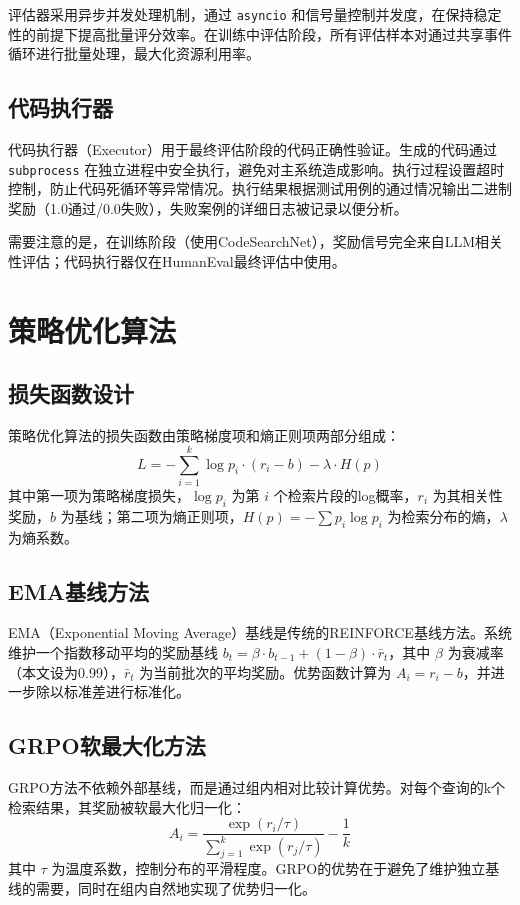 \documentclass[
    fontset = win, %
  ]{njuthesis}
\begin{document}
评估器采用异步并发处理机制，通过 \texttt{asyncio} 和信号量控制并发度，在保持稳定性的前提下提高批量评分效率。在训练中评估阶段，所有评估样本对通过共享事件循环进行批量处理，最大化资源利用率。

\subsection{代码执行器}

代码执行器（Executor）用于最终评估阶段的代码正确性验证。生成的代码通过 \texttt{subprocess} 在独立进程中安全执行，避免对主系统造成影响。执行过程设置超时控制，防止代码死循环等异常情况。执行结果根据测试用例的通过情况输出二进制奖励（1.0通过/0.0失败），失败案例的详细日志被记录以便分析。

需要注意的是，在训练阶段（使用CodeSearchNet），奖励信号完全来自LLM相关性评估；代码执行器仅在HumanEval最终评估中使用。

\section{策略优化算法}

\subsection{损失函数设计}

策略优化算法的损失函数由策略梯度项和熵正则项两部分组成：
\[
L = -\sum_{i=1}^k \log p_i \cdot (r_i - b) - \lambda \cdot H(p)
\]
其中第一项为策略梯度损失，$\log p_i$ 为第 $i$ 个检索片段的log概率，$r_i$ 为其相关性奖励，$b$ 为基线；第二项为熵正则项，$H(p) = -\sum p_i \log p_i$ 为检索分布的熵，$\lambda$ 为熵系数。

\subsection{EMA基线方法}

EMA（Exponential Moving Average）基线是传统的REINFORCE基线方法。系统维护一个指数移动平均的奖励基线 $b_t = \beta \cdot b_{t-1} + (1 - \beta) \cdot \bar{r}_t$，其中 $\beta$ 为衰减率（本文设为0.99），$\bar{r}_t$ 为当前批次的平均奖励。优势函数计算为 $A_i = r_i - b$，并进一步除以标准差进行标准化。

\subsection{GRPO软最大化方法}

GRPO方法不依赖外部基线，而是通过组内相对比较计算优势。对每个查询的k个检索结果，其奖励被软最大化归一化：
\[
A_i = \frac{\exp(r_i / \tau)}{\sum_{j=1}^k \exp(r_j / \tau)} - \frac{1}{k}
\]
其中 $\tau$ 为温度系数，控制分布的平滑程度。GRPO的优势在于避免了维护独立基线的需要，同时在组内自然地实现了优势归一化。
\end{document}
